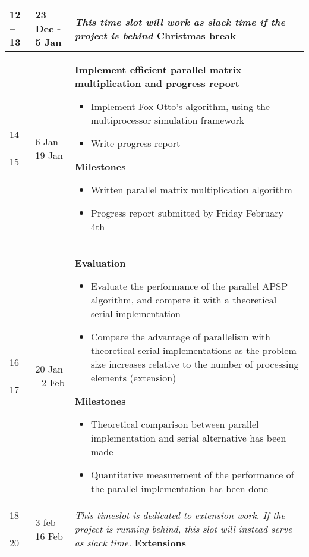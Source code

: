 \documentclass[../dissertation/diss.tex]{subfiles}
\begin{document}
\begin{longtable}{m{40pt}m{75pt}m{265pt}}
    \hline
    12 -- 13 & 23 Dec - 5 Jan & %
    \textit{This time slot will work as slack time if the project is behind}
    \textbf{Christmas break} \\
    \hline
    14 -- 15 & 6 Jan - 19 Jan &
    \textbf{Implement efficient parallel matrix multiplication and progress report}
    \begin{itemize}
        \item Implement Fox-Otto's algorithm, using
            the multiprocessor simulation framework
        \item Write progress report
    \end{itemize}
    \textbf{Milestones}
    \begin{itemize}
        \item Written parallel matrix multiplication algorithm
        \item Progress report submitted by Friday February 4th
    \end{itemize} \\
    \hline
    16 -- 17 & 20 Jan - 2 Feb & %
    \textbf{Evaluation}
    \begin{itemize}
        \item Evaluate the performance of the parallel APSP algorithm, and compare it with
            a theoretical serial implementation
        \item Compare the advantage of parallelism with theoretical serial implementations
            as the problem size increases relative to the number of processing
            elements (extension)
    \end{itemize}
    \textbf{Milestones}
    \begin{itemize}
        \item Theoretical comparison between parallel implementation and serial
            alternative has been made
        \item Quantitative measurement of the performance of the parallel
            implementation has been done
    \end{itemize} \\
    \hline
    18 -- 20 & 3 feb - 16 Feb & %
    
    \textit{This timeslot is dedicated to extension work. If the project is
    running behind, this slot will instead serve as slack time.}
    \textbf{Extensions}


\end{longtable}
\end{document}
